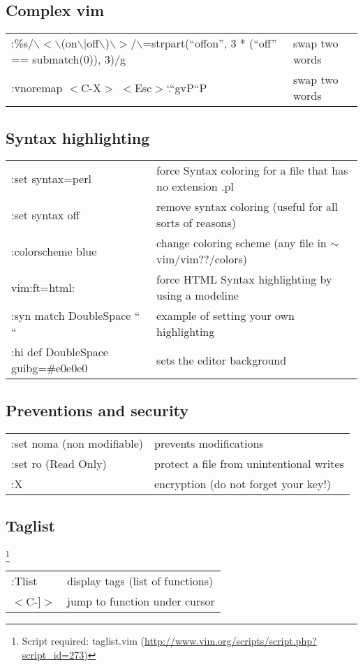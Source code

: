 \subsection{Complex vim}
\begin{center}
\begin{longtable}{l|l}
:\%s/$\backslash$$<$$\backslash$(on$\backslash$$|$off$\backslash$)$\backslash$$>$/$\backslash$=strpart(``offon'', 3 * (``off'' == submatch(0)), 3)/g & swap two words\\
:vnoremap $<$C-X$>$ $<$Esc$>$`.``gvP``P & swap two words
\end{longtable}
\end{center}

\subsection{Syntax highlighting}
\begin{center}
\begin{longtable}{l|l}
 :set syntax=perl & force Syntax coloring for a file that has no extension .pl\\
 :set syntax off & remove syntax coloring (useful for all sorts of reasons)\\
 :colorscheme blue & change coloring scheme (any file in $\sim$vim/vim??/colors)\\
 vim:ft=html: & force HTML Syntax highlighting by using a modeline\\
 :syn match DoubleSpace `` `` & example of setting your own highlighting\\
 :hi def DoubleSpace guibg=\#e0e0e0 & sets the editor background
\end{longtable}
\end{center}

\subsection{Preventions and security}
\begin{center}
\begin{longtable}{l|l}
 :set noma (non modifiable) & prevents modifications\\
 :set ro (Read Only) & protect a file from unintentional writes\\
 :X & encryption (do not forget your key!)
\end{longtable}
\end{center}

\subsection{Taglist}
\footnote{Script required: taglist.vim (\url{http://www.vim.org/scripts/script.php?script_id=273)}}
\begin{center}
\begin{longtable}{l|l}
:Tlist & display tags (list of functions)\\
$<$C-]$>$  & jump to function under cursor
\end{longtable}
\end{center}

